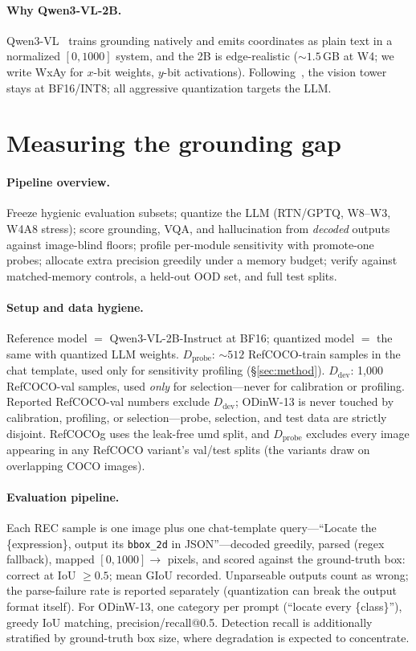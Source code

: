 \documentclass{article}
\newcommand{\bbox}{\texttt{bbox\_2d}}
\begin{document}
\paragraph{Why Qwen3-VL-2B.} Qwen3-VL~\cite{qwen3vl} trains grounding natively and emits coordinates as plain text in a normalized $[0,1000]$ system, and the 2B is edge-realistic (${\sim}1.5$\,GB at W4; we write WxAy for $x$-bit weights, $y$-bit activations). Following~\cite{rethinkingsmall}, the vision tower stays at BF16/INT8; all aggressive quantization targets the LLM.

\section{Measuring the grounding gap}

\paragraph{Pipeline overview.} Freeze hygienic evaluation subsets; quantize the LLM (RTN/GPTQ, W8--W3, W4A8 stress); score grounding, VQA, and hallucination from \emph{decoded} outputs against image-blind floors; profile per-module sensitivity with promote-one probes; allocate extra precision greedily under a memory budget; verify against matched-memory controls, a held-out OOD set, and full test splits.

\paragraph{Setup and data hygiene.} Reference model $=$ Qwen3-VL-2B-Instruct at BF16; quantized model $=$ the same with quantized LLM weights. $D_{\text{probe}}$: ${\sim}512$ RefCOCO-train samples in the chat template, used only for sensitivity profiling (\S\ref{sec:method}). $D_{\text{dev}}$: 1{,}000 RefCOCO-val samples, used \emph{only} for selection---never for calibration or profiling. Reported RefCOCO-val numbers exclude $D_{\text{dev}}$; ODinW-13 is never touched by calibration, profiling, or selection---probe, selection, and test data are strictly disjoint. RefCOCOg uses the leak-free umd split, and $D_{\text{probe}}$ excludes every image appearing in any RefCOCO variant's val/test splits (the variants draw on overlapping COCO images).

\paragraph{Evaluation pipeline.} Each REC sample is one image plus one chat-template query---``Locate the \{expression\}, output its \bbox{} in JSON''---decoded greedily, parsed (regex fallback), mapped $[0,1000] \to$ pixels, and scored against the ground-truth box: correct at IoU $\ge 0.5$; mean GIoU recorded. Unparseable outputs count as wrong; the parse-failure rate is reported separately (quantization can break the output format itself). For ODinW-13, one category per prompt (``locate every \{class\}''), greedy IoU matching, precision/recall@0.5. Detection recall is additionally stratified by ground-truth box size, where degradation is expected to concentrate.
\end{document}
